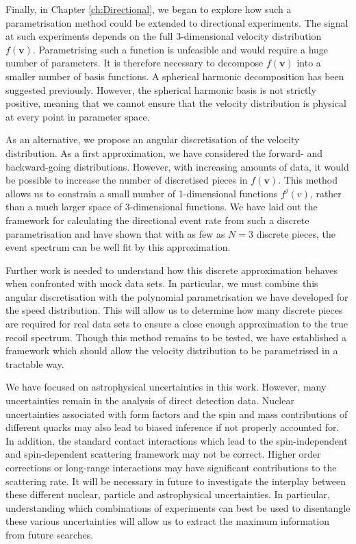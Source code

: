 Finally, in Chapter \ref{ch:Directional}, we began to explore how such a parametrisation method could be extended to directional experiments. The signal at such experiments depends on the full 3-dimensional velocity distribution $f(\textbf{v})$. Parametrising such a function is unfeasible and would require a huge number of parameters. It is therefore necessary to decompose $f(\textbf{v})$ into a smaller number of basis functions. A spherical harmonic decomposition has been suggested previously. However, the spherical harmonic basis is not strictly positive, meaning that we cannot ensure that the velocity distribution is physical at every point in parameter space.

As an alternative, we propose an angular discretisation of the velocity distribution. As a first approximation, we have considered the forward- and backward-going distributions. However, with increasing amounts of data, it would be possible to increase the number of discretised pieces in $f(\textbf{v})$. This method allows us to constrain a small number of 1-dimensional functions $f^j(v)$, rather than a much larger space of 3-dimensional functions. We have laid out the framework for calculating the directional event rate from such a discrete parametrisation and have shown that with as few as $N=3$ discrete pieces, the event spectrum can be well fit by this approximation.

Further work is needed to understand how this discrete approximation behaves when confronted with mock data sets. In particular, we must combine this angular discretisation with the polynomial parametrisation we have developed for the speed distribution. This will allow us to determine how many discrete pieces are required for real data sets to ensure a close enough approximation to the true recoil spectrum. Though this method remains to be tested, we have established a framework which should allow the velocity distribution to be parametrised in a tractable way.

We have focused on astrophysical uncertainties in this work. However, many uncertainties remain in the analysis of direct detection data. Nuclear uncertainties associated with form factors and the spin and mass contributions of different quarks may also lead to biased inference if not properly accounted for. In addition, the standard contact interactions which lead to the spin-independent and spin-dependent scattering framework may not be correct. Higher order corrections or long-range interactions may have significant contributions to the scattering rate. It will be necessary in future to investigate the interplay between these different nuclear, particle and astrophysical uncertainties. In particular, understanding which combinations of experiments can best be used to disentangle these various uncertainties will allow us to extract the maximum information from future searches.

